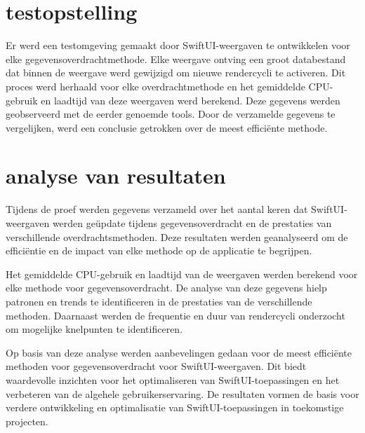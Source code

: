 \section{testopstelling}
Er werd een testomgeving gemaakt door SwiftUI-weergaven te ontwikkelen voor elke gegevensoverdrachtmethode. Elke weergave ontving een groot databestand dat binnen de weergave werd gewijzigd om nieuwe rendercycli te activeren. Dit proces werd herhaald voor elke overdrachtmethode en het gemiddelde CPU-gebruik en laadtijd van deze weergaven werd berekend. Deze gegevens werden geobserveerd met de eerder genoemde tools. Door de verzamelde gegevens te vergelijken, werd een conclusie getrokken over de meest efficiënte methode.

\section{analyse van resultaten}
Tijdens de proef werden gegevens verzameld over het aantal keren dat SwiftUI-weergaven werden geüpdate tijdens gegevensoverdracht en de prestaties van verschillende overdrachtsmethoden. Deze resultaten werden geanalyseerd om de efficiëntie en de impact van elke methode op de applicatie te begrijpen.

Het gemiddelde CPU-gebruik en laadtijd van de weergaven werden berekend voor elke methode voor gegevensoverdracht. De analyse van deze gegevens hielp patronen en trends te identificeren in de prestaties van de verschillende methoden. Daarnaast werden de frequentie en duur van rendercycli onderzocht om mogelijke knelpunten te identificeren.

Op basis van deze analyse werden aanbevelingen gedaan voor de meest efficiënte methoden voor gegevensoverdracht voor SwiftUI-weergaven. Dit biedt waardevolle inzichten voor het optimaliseren van SwiftUI-toepassingen en het verbeteren van de algehele gebruikerservaring. De resultaten vormen de basis voor verdere ontwikkeling en optimalisatie van SwiftUI-toepassingen in toekomstige projecten.

